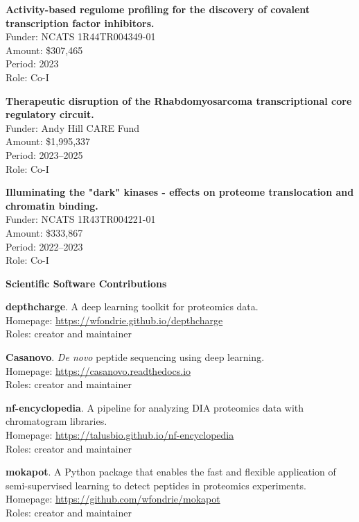 \documentclass[11pt]{article}
\newcommand{\mysection}[1]{\vspace{1ex} \textbf{\large \textsf{#1} \quad \hrulefill}}
\newcommand{\myref}[1]{\href{#1}{\url{#1}}}
\begin{document}
{{\begin{etaremune}
  \item \textbf{Activity-based regulome profiling for the discovery of covalent transcription factor inhibitors.} \\
  Funder: NCATS 1R44TR004349-01 \\
  Amount: \$307,465\\
  Period: 2023 \\
  Role: Co-I

  \item \textbf{Therapeutic disruption of the Rhabdomyosarcoma transcriptional core regulatory circuit.} \\
  Funder: Andy Hill CARE Fund \\
  Amount: \$1,995,337\\
  Period: 2023--2025 \\
  Role: Co-I

  \item \textbf{Illuminating the "dark" kinases - effects on proteome translocation and chromatin binding.} \\
  Funder: NCATS 1R43TR004221-01 \\
  Amount: \$333,867 \\
  Period: 2022--2023 \\
  Role: Co-I

\end{etaremune}

\mysection{Scientific Software Contributions}
\begin{etaremune}
  \item \textbf{depthcharge}. A deep learning toolkit for proteomics data. \\
  Homepage: \myref{https://wfondrie.github.io/depthcharge} \\
  Roles: creator and maintainer

  \item \textbf{Casanovo}. \textit{ De novo } peptide sequencing using deep learning. \\
  Homepage: \myref{https://casanovo.readthedocs.io} \\
  Roles: creator and maintainer

  \item \textbf{nf-encyclopedia}. A pipeline for analyzing DIA proteomics data with chromatogram libraries. \\
  Homepage: \myref{https://talusbio.github.io/nf-encyclopedia} \\
  Roles: creator and maintainer

  \item \textbf{mokapot}. A Python package that enables the fast and flexible
  application of semi-supervised learning to detect peptides in proteomics
  experiments. \\
  Homepage: \myref{https://github.com/wfondrie/mokapot} \\
  Roles: creator and maintainer


\end{etaremune}}}
\end{document}
